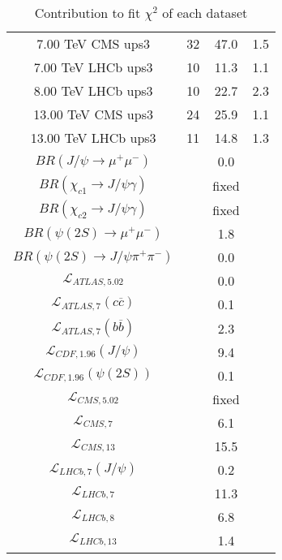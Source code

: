 \begin{table}[h!]
\begin{tabular}{c|c|c|c}
7.00 TeV CMS ups3 & 32 & 47.0 & 1.5 \\
7.00 TeV LHCb ups3 & 10 & 11.3 & 1.1 \\
8.00 TeV LHCb ups3 & 10 & 22.7 & 2.3 \\
13.00 TeV CMS ups3 & 24 & 25.9 & 1.1 \\
13.00 TeV LHCb ups3 & 11 & 14.8 & 1.3 \\
\hline
$BR(J/\psi\rightarrow\mu^+\mu^-)$ &  & 0.0 &  \\
$BR(\chi_{c1}\rightarrow J/\psi\gamma)$ &  & fixed & \\
$BR(\chi_{c2}\rightarrow J/\psi\gamma)$ &  & fixed & \\
$BR(\psi(2S)\rightarrow\mu^+\mu^-)$ &  & 1.8 &  \\
$BR(\psi(2S)\rightarrow J/\psi\pi^+\pi^-)$ &  & 0.0 &  \\
$\mathcal L_{ATLAS,5.02}$ &  & 0.0 &  \\
$\mathcal L_{ATLAS,7}(c\overline c)$ &  & 0.1 &  \\
$\mathcal L_{ATLAS,7}(b\overline b)$ &  & 2.3 &  \\
$\mathcal L_{CDF,1.96}(J/\psi)$ &  & 9.4 &  \\
$\mathcal L_{CDF,1.96}(\psi(2S))$ &  & 0.1 &  \\
$\mathcal L_{CMS,5.02}$ &  & fixed & \\
$\mathcal L_{CMS,7}$ &  & 6.1 &  \\
$\mathcal L_{CMS,13}$ &  & 15.5 &  \\
$\mathcal L_{LHCb,7}(J/\psi)$ &  & 0.2 &  \\
$\mathcal L_{LHCb,7}$ &  & 11.3 &  \\
$\mathcal L_{LHCb,8}$ &  & 6.8 &  \\
$\mathcal L_{LHCb,13}$ &  & 1.4 &  \\
\end{tabular}
\caption{Contribution to fit $\chi^2$ of each dataset}
\end{table}
